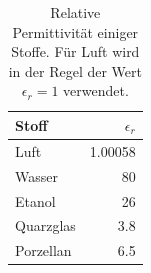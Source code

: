 \documentclass[11pt,twoside=false,open=any]{scrbook}
\begin{document}
\begin{table}
\begin{center}
\begin{tabular}{|l|r|}
\hline
Stoff 				& $\epsilon_{r}$ \\
\hline
Luft  								& 1.00058 \\
Wasser 								& 80 \\
Etanol  							& 26 \\
Quarzglas 						& 3.8 \\
Porzellan  						& 6.5 \\
\hline
\end{tabular}
\caption{Relative Permittivität einiger Stoffe. Für Luft wird in der Regel der Wert $\epsilon_{r} = 1$ verwendet.}
\label{tab:epsilon}
\end{center}
\end{table}
\end{document}

